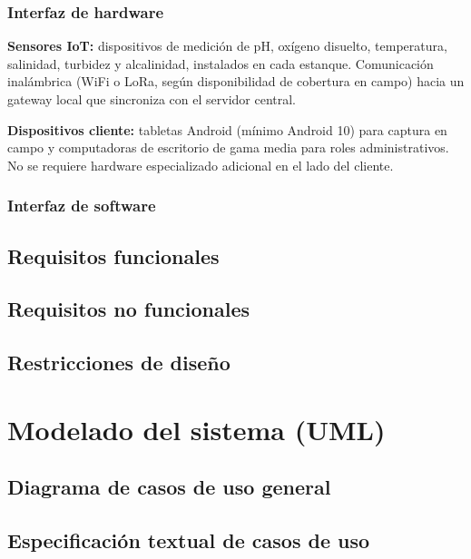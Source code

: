 \documentclass[11pt,a4paper]{article}
\begin{document}
\subsubsection{Interfaz de hardware}

\textbf{Sensores IoT:} dispositivos de medición de pH, oxígeno disuelto, temperatura, salinidad, turbidez y alcalinidad, instalados en cada estanque. Comunicación inalámbrica (WiFi o LoRa, según disponibilidad de cobertura en campo) hacia un gateway local que sincroniza con el servidor central.

\textbf{Dispositivos cliente:} tabletas Android (mínimo Android 10) para captura en campo y computadoras de escritorio de gama media para roles administrativos. No se requiere hardware especializado adicional en el lado del cliente.

\subsubsection{Interfaz de software}



\subsection{Requisitos funcionales}


\subsection{Requisitos no funcionales}



\subsection{Restricciones de diseño}


\section{Modelado del sistema (UML)}

\subsection{Diagrama de casos de uso general}

\subsection{Especificación textual de casos de uso}
\end{document}
